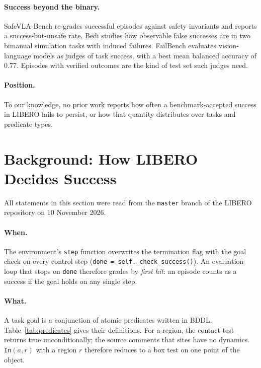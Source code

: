 \documentclass[10pt,twocolumn]{article}
\newcommand{\pred}[1]{\texttt{#1}}
\begin{document}
\paragraph{Success beyond the binary.} SafeVLA-Bench \cite{fan2026safevla} re-grades successful episodes against safety invariants and reports a success-but-unsafe rate. Bedi \cite{bedi2026silent} studies how observable false successes are in two bimanual simulation tasks with induced failures. FailBench \cite{navasardyan2026failbench} evaluates vision-language models as judges of task success, with a best mean balanced accuracy of 0.77. Episodes with verified outcomes are the kind of test set such judges need.

\paragraph{Position.} To our knowledge, no prior work reports how often a benchmark-accepted success in LIBERO fails to persist, or how that quantity distributes over tasks and predicate types.

\section{Background: How LIBERO Decides Success}
\label{sec:background}

All statements in this section were read from the \texttt{master} branch of the LIBERO repository on 10 November 2026.

\paragraph{When.} The environment's \texttt{step} function overwrites the termination flag with the goal check on every control step (\texttt{done = self.\_check\_success()}). An evaluation loop that stops on \texttt{done} therefore grades by \emph{first hit}: an episode counts as a success if the goal holds on any single step.

\paragraph{What.} A task goal is a conjunction of atomic predicates written in BDDL. Table~\ref{tab:predicates} gives their definitions. For a region, the contact test returns true unconditionally; the source comments that sites have no dynamics. \pred{In}$(a,r)$ with a region $r$ therefore reduces to a box test on one point of the object.
\end{document}
